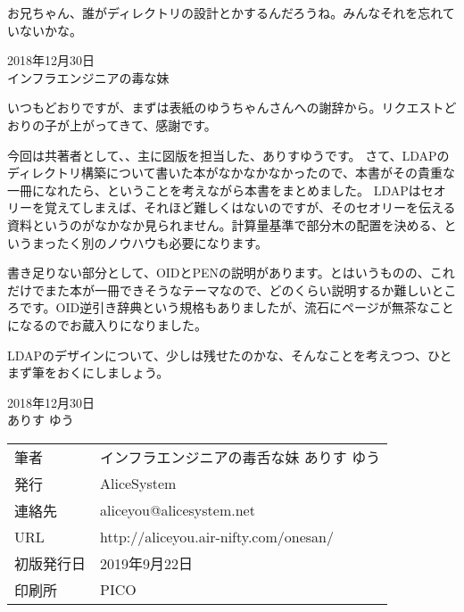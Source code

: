 お兄ちゃん、誰がディレクトリの設計とかするんだろうね。みんなそれを忘れていないかな。

\begin{flushright}
2018年12月30日 \\
インフラエンジニアの毒な妹 \\
\end{flushright}

いつもどおりですが、まずは表紙のゆうちゃんさんへの謝辞から。リクエストどおりの子が上がってきて、感謝です。

今回は共著者として、、主に図版を担当した、ありすゆうです。
さて、LDAPのディレクトリ構築について書いた本がなかなかなかったので、本書がその貴重な一冊になれたら、ということを考えながら本書をまとめました。
LDAPはセオリーを覚えてしまえば、それほど難しくはないのですが、そのセオリーを伝える資料というのがなかなか見られません。計算量基準で部分木の配置を決める、というまったく別のノウハウも必要になります。

書き足りない部分として、OIDとPENの説明があります。とはいうものの、これだけでまた本が一冊できそうなテーマなので、どのくらい説明するか難しいところです。OID逆引き辞典という規格もありましたが、流石にページが無茶なことになるのでお蔵入りになりました。

LDAPのデザインについて、少しは残せたのかな、そんなことを考えつつ、ひとまず筆をおくにしましょう。

\begin{flushright}
2018年12月30日 \\
ありす ゆう
\end{flushright}




\mbox{}
\newpage
\clearpage



\vspace*{\fill}
\begin{tabular}{ll} \toprule
筆者 & インフラエンジニアの毒舌な妹 ありす ゆう\\
発行 & AliceSystem \\
連絡先 & aliceyou@alicesystem.net \\
URL & http://aliceyou.air-nifty.com/onesan/ \\
初版発行日 & 2019年9月22日 \\
印刷所 & PICO  \\ \bottomrule
\end{tabular}